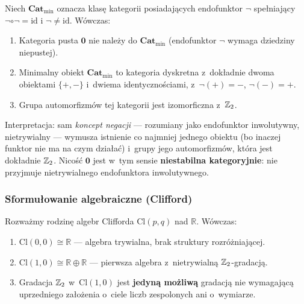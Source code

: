 \begin{proposition}%
\label{prop:0-endofunktor}
Niech $\mathbf{Cat}_{\min}$ oznacza klas\k{e} kategorii posiadaj\k{a}cych
endofunktor $\neg$ spe\l{}niaj\k{a}cy $\neg\circ\neg = \mathrm{id}$ i
$\neg \neq \mathrm{id}$. W\'owczas:
\begin{enumerate}[label=(\roman*), nosep]
  \item Kategoria pusta $\mathbf{0}$ nie nale\.zy do $\mathbf{Cat}_{\min}$
    (endofunktor $\neg$ wymaga dziedziny niepustej).
  \item Minimalny obiekt $\mathbf{Cat}_{\min}$ to kategoria dyskretna
    z~dok\l{}adnie dwoma obiektami $\{+, -\}$ i~dwiema identyczno\'sciami,
    z~$\neg(+) = -$, $\neg(-) = +$.
  \item Grupa automorfizm\'ow tej kategorii jest izomorficzna z~$\mathbb{Z}_2$.
\end{enumerate}
\end{proposition}

Interpretacja: sam \emph{koncept negacji} --- rozumiany jako
endofunktor inwolutywny, nietrywialny --- wymusza istnienie co
najmniej jednego obiektu (bo inaczej funktor nie ma na czym
dzia\l{}a\'c) i~grupy jego automorfizm\'ow, kt\'ora jest dok\l{}adnie
$\mathbb{Z}_2$. Nicość $\mathbf{0}$ jest w~tym sensie \textbf{niestabilna
kategoryjnie}: nie przyjmuje nietrywialnego endofunktora
inwolutywnego.

\subsubsection{Sformu\l{}owanie algebraiczne (Clifford)}%
\label{app:0-clifford}

\begin{proposition}\label{prop:0-clifford}
Rozwa\.zmy rodzin\k{e} algebr Clifforda $\mathrm{Cl}(p,q)$ nad
$\mathbb{R}$. W\'owczas:
\begin{enumerate}[label=(\roman*), nosep]
  \item $\mathrm{Cl}(0,0) \cong \mathbb{R}$ --- algebra trywialna,
    brak struktury rozr\'o\.zniaj\k{a}cej.
  \item $\mathrm{Cl}(1,0) \cong \mathbb{R} \oplus \mathbb{R}$
    --- pierwsza algebra z~nietrywialn\k{a} $\mathbb{Z}_2$-gradacj\k{a}.
  \item Gradacja $\mathbb{Z}_2$ w~$\mathrm{Cl}(1,0)$ jest \textbf{jedyn\k{a}
    mo\.zliw\k{a}} gradacj\k{a} nie wymagaj\k{a}c\k{a} uprzedniego
    za\l{}o\.zenia o~ciele liczb zespolonych ani o~wymiarze.
\end{enumerate}
\end{proposition}

